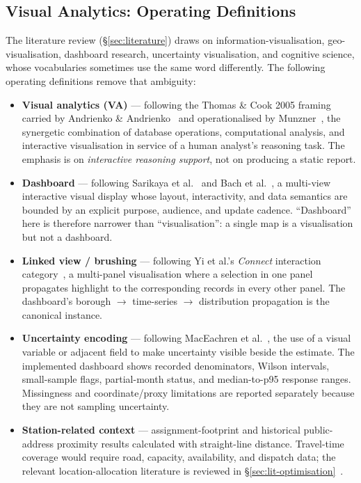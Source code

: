 \subsection{Visual Analytics: Operating Definitions}\label{sec:background-va}

The literature review (\S\ref{sec:literature}) draws on information-visualisation, geo-visualisation, dashboard research, uncertainty visualisation, and cognitive science, whose vocabularies sometimes use the same word differently. The following operating definitions remove that ambiguity:

\begin{itemize}
    \item \textbf{Visual analytics (VA)} --- following the Thomas \& Cook 2005 framing carried by Andrienko \& Andrienko~\cite{andrienko2007} and operationalised by Munzner~\cite{munzner2009,munzner2014}, the synergetic combination of database operations, computational analysis, and interactive visualisation in service of a human analyst's reasoning task. The emphasis is on \emph{interactive reasoning support}, not on producing a static report.
    \item \textbf{Dashboard} --- following Sarikaya et al.~\cite{sarikaya2018} and Bach et al.~\cite{bach2023patterns}, a multi-view interactive visual display whose layout, interactivity, and data semantics are bounded by an explicit purpose, audience, and update cadence. ``Dashboard'' here is therefore narrower than ``visualisation'': a single map is a visualisation but not a dashboard.
    \item \textbf{Linked view / brushing} --- following Yi et al.'s \emph{Connect} interaction category~\cite{yi2007}, a multi-panel visualisation where a selection in one panel propagates highlight to the corresponding records in every other panel. The dashboard's borough $\to$ time-series $\to$ distribution propagation is the canonical instance.
    \item \textbf{Uncertainty encoding} --- following MacEachren et al.~\cite{maceachren2012}, the use of a visual variable or adjacent field to make uncertainty visible beside the estimate. The implemented dashboard shows recorded denominators, Wilson intervals, small-sample flags, partial-month status, and median-to-p95 response ranges. Missingness and coordinate/proxy limitations are reported separately because they are not sampling uncertainty.
    \item \textbf{Station-related context} --- assignment-footprint and historical public-address proximity results calculated with straight-line distance. Travel-time coverage would require road, capacity, availability, and dispatch data; the relevant location-allocation literature is reviewed in \S\ref{sec:lit-optimisation}~\cite{church1974,goldberg2004,reconfig2023,beijing2021,ocmola2018,spacesyntax2023}.
\end{itemize}

